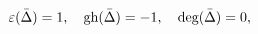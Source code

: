 \begin{equation}\label{4.2}
\varepsilon(\bar{\Delta})=1,\quad \hbox{gh}(\bar{\Delta})=-1,\quad
\hbox{deg}(\bar{\Delta})=0,
\end{equation}

